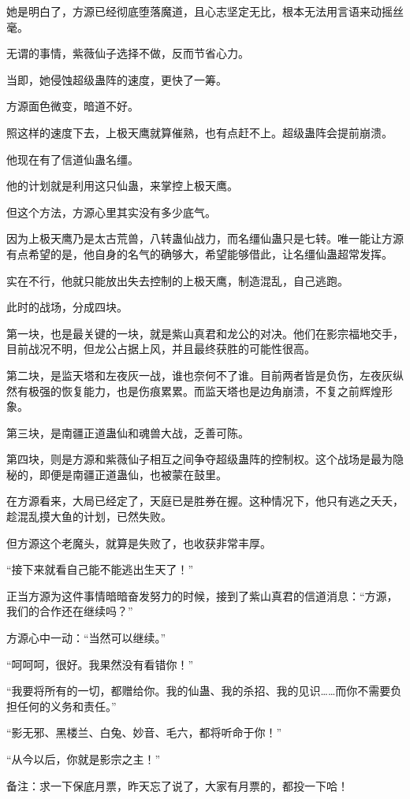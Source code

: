\begin{this_body}
她是明白了，方源已经彻底堕落魔道，且心志坚定无比，根本无法用言语来动摇丝毫。

无谓的事情，紫薇仙子选择不做，反而节省心力。

当即，她侵蚀超级蛊阵的速度，更快了一筹。

方源面色微变，暗道不好。

照这样的速度下去，上极天鹰就算催熟，也有点赶不上。超级蛊阵会提前崩溃。

他现在有了信道仙蛊名缰。

他的计划就是利用这只仙蛊，来掌控上极天鹰。

但这个方法，方源心里其实没有多少底气。

因为上极天鹰乃是太古荒兽，八转蛊仙战力，而名缰仙蛊只是七转。唯一能让方源有点希望的是，他自身的名气的确够大，希望能够借此，让名缰仙蛊超常发挥。

实在不行，他就只能放出失去控制的上极天鹰，制造混乱，自己逃跑。

此时的战场，分成四块。

第一块，也是最关键的一块，就是紫山真君和龙公的对决。他们在影宗福地交手，目前战况不明，但龙公占据上风，并且最终获胜的可能性很高。

第二块，是监天塔和左夜灰一战，谁也奈何不了谁。目前两者皆是负伤，左夜灰纵然有极强的恢复能力，也是伤痕累累。而监天塔也是边角崩溃，不复之前辉煌形象。

第三块，是南疆正道蛊仙和魂兽大战，乏善可陈。

第四块，则是方源和紫薇仙子相互之间争夺超级蛊阵的控制权。这个战场是最为隐秘的，即便是南疆正道蛊仙，也被蒙在鼓里。

在方源看来，大局已经定了，天庭已是胜券在握。这种情况下，他只有逃之夭夭，趁混乱摸大鱼的计划，已然失败。

但方源这个老魔头，就算是失败了，也收获非常丰厚。

“接下来就看自己能不能逃出生天了！”

正当方源为这件事情暗暗奋发努力的时候，接到了紫山真君的信道消息：“方源，我们的合作还在继续吗？”

方源心中一动：“当然可以继续。”

“呵呵呵，很好。我果然没有看错你！”

“我要将所有的一切，都赠给你。我的仙蛊、我的杀招、我的见识……而你不需要负担任何的义务和责任。”

“影无邪、黑楼兰、白兔、妙音、毛六，都将听命于你！”

“从今以后，你就是影宗之主！”

备注：求一下保底月票，昨天忘了说了，大家有月票的，都投一下哈！

\end{this_body}

